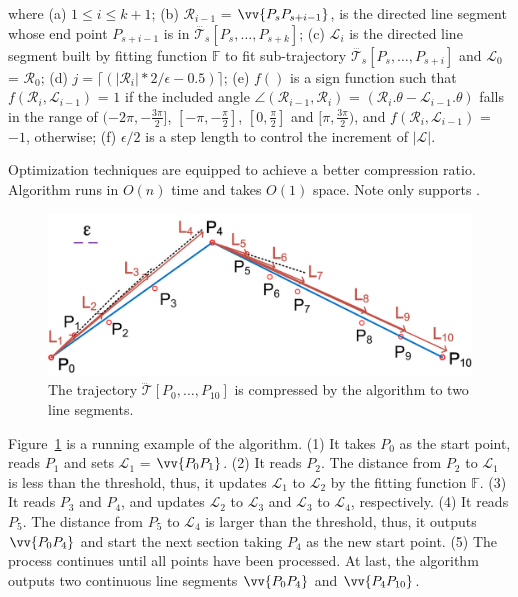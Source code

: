 \ni where (a) $1 \le i \le k+1$; (b) $\mathcal{R}_{i-1}$ = $\vv{P_sP_{s+i-1}}$, is the directed line segment whose end point $P_{s+i-1}$ is in $\dddot{\mathcal{T}_s}[P_s, \ldots, P_{s+k}]$; (c) $\mathcal{L}_{i}$ is the directed line segment built by fitting function $\mathbb{F}$ to fit sub-trajectory $\dddot{\mathcal{T}_s}[P_s, \ldots, P_{s+i}]$ and $\mathcal{L}_{0}$ = $\mathcal{R}_{0}$; (d) $j = \lceil(|\mathcal{R}_{i}|*2/\epsilon - 0.5)\rceil$; (e) $f()$ is a sign function such that $ f(\mathcal{R}_i,\mathcal{L}_{i-1})$ = $1$ if the included angle $\angle(\mathcal{R}_{i-1}, \mathcal{R}_{i})$ = $(\mathcal{R}_i.\theta - \mathcal{L}_{i-1}.\theta)$ falls in the range of $(-2\pi, -\frac{3\pi}{2}]$, $[-\pi, -\frac{\pi}{2}]$, $[0, \frac{\pi}{2}]$ and $[\pi, \frac{3\pi}{2})$, and $f(\mathcal{R}_i,\mathcal{L}_{i-1})$ = $-1$, otherwise; (f) $\epsilon/2$ is a step length to control the increment of $|\mathcal{L}|$.

Optimization techniques are equipped to achieve a better compression ratio\cite{Lin:Operb}.
Algorithm \operb runs in $O(n)$ time and takes $O(1)$ space.
Note \operb only supports \ped.


\begin{figure}[tb!]
\centering
\includegraphics[scale=0.66]{figures/Fig-oper.png}
\vspace{-1ex}
\caption{\small The trajectory $\dddot{\mathcal{T}}[P_0, \ldots, P_{10}]$ is compressed by the \operb algorithm to two line segments.}
\vspace{-2ex}
\label{fig:operb}
\end{figure}


\begin{example}
\label{exm-alg-operb}
Figure~\ref{fig:operb} is a running example of the \operb algorithm.
(1) It takes $P_0$ as the start point, reads $P_1$ and sets $\mathcal{L}_1$ = $\vv{P_0P_1}$.
(2) It reads $P_2$. The distance from $P_2$ to $\mathcal{L}_1$ is less than the threshold, thus, it updates $\mathcal{L}_1$  to $\mathcal{L}_2$ by the fitting function $\mathbb{F}$.
(3) It reads $P_3$ and $P_4$, and updates $\mathcal{L}_2$ to $\mathcal{L}_3$ and $\mathcal{L}_3$ to $\mathcal{L}_4$, respectively.
(4) It reads $P_5$. The distance from $P_5$ to $\mathcal{L}_4$ is larger than the threshold, thus, it outputs $\vv{P_0P_4}$ and start the next section taking $P_4$ as the new start point.
(5) The process continues until all points have been processed. At last, the algorithm outputs two continuous line segments $\vv{P_0P_4}$ and $\vv{P_4P_{10}}$.
\end{example}



